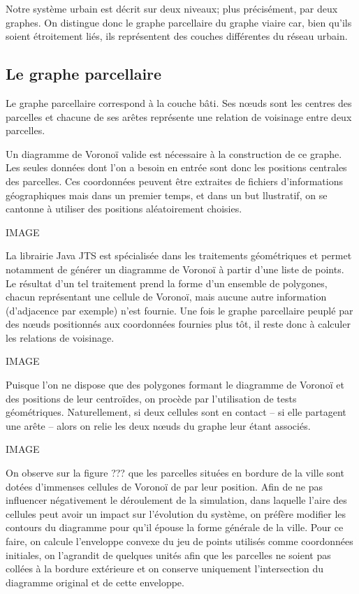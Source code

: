 \documentclass[12pt]{article}
\begin{document}
Notre système urbain est décrit sur deux niveaux; plus précisément,
par deux graphes. On distingue donc le graphe parcellaire du graphe
viaire car, bien qu'ils soient étroitement liés, ils représentent des
couches différentes du réseau urbain.

\subsection{Le graphe parcellaire}

Le graphe parcellaire correspond à la couche bâti. Ses n\oe uds sont
les centres des parcelles et chacune de ses arêtes représente une
relation de voisinage entre deux parcelles.

Un diagramme de Voronoï valide est nécessaire à la construction de ce
graphe. Les seules données dont l'on a besoin en entrée sont donc les
positions centrales des parcelles. Ces coordonnées peuvent être
extraites de fichiers d'informations géographiques mais dans un
premier temps, et dans un but llustratif, on se cantonne à utiliser
des positions aléatoirement choisies.

IMAGE

La librairie Java JTS est spécialisée dans les traitements
géométriques et permet notamment de générer un diagramme de Voronoï à
partir d'une liste de points. Le résultat d'un tel traitement prend la
forme d'un ensemble de polygones, chacun représentant une cellule de
Voronoï, mais aucune autre information (d'adjacence par exemple) n'est
fournie. Une fois le graphe parcellaire peuplé par des n\oe uds
positionnés aux coordonnées fournies plus tôt, il reste donc à
calculer les relations de voisinage.

IMAGE

Puisque l'on ne dispose que des polygones formant le diagramme de
Voronoï et des positions de leur centroïdes, on procède par
l'utilisation de tests géométriques. Naturellement, si deux cellules
sont en contact -- si elle partagent une arête -- alors on relie les
deux n\oe uds du graphe leur étant associés.

IMAGE

On observe sur la figure ??? que les parcelles situées en bordure de
la ville sont dotées d'immenses cellules de Voronoï de par leur
position. Afin de ne pas influencer négativement le déroulement de la
simulation, dans laquelle l'aire des cellules peut avoir un impact sur
l'évolution du système, on préfère modifier les contours du diagramme
pour qu'il épouse la forme générale de la ville. Pour ce faire, on
calcule l'enveloppe convexe du jeu de points utilisés comme
coordonnées initiales, on l'agrandit de quelques unités afin que les
parcelles ne soient pas collées à la bordure extérieure et on conserve
uniquement l'intersection du diagramme original et de cette enveloppe.
\end{document}
